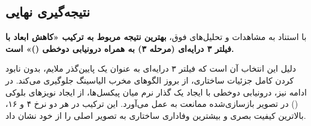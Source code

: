 \subsection*{نتیجه‌گیری نهایی}
با استناد به مشاهدات و تحلیل‌های فوق، \textbf{بهترین نتیجه مربوط به ترکیب «کاهش ابعاد با فیلتر ۳ درایه‌ای (مرحله ۳) به همراه درونیابی دوخطی ()» است.} 

دلیل این انتخاب آن است که فیلتر ۳ درایه‌ای به عنوان یک پایین‌گذر ملایم، بدون نابود کردن کامل جزئیات ساختاری، از بروز الگوهای مخرب الیاسینگ جلوگیری می‌کند. در ادامه نیز، درونیابی دوخطی با ایجاد یک گذار نرم میان پیکسل‌ها، از ایجاد نویزهای بلوکی () در تصویر بازسازی‌شده ممانعت به عمل می‌آورد. این ترکیب در هر دو نرخ ۴ و ۱۶، بالاترین کیفیت بصری و بیشترین وفاداری ساختاری به تصویر اصلی را از خود نشان داد.